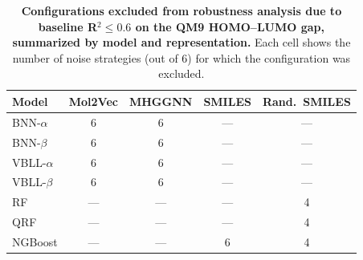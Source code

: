 
\begin{table}[H]
\centering
\caption{\textbf{Configurations excluded from robustness analysis due to baseline R$^2 \leq 0.6$ on the QM9 HOMO--LUMO gap, summarized by model and representation.}
Each cell shows the number of noise strategies (out of 6) for which the configuration was excluded.}
\label{app:noise:excluded_configurations}
\small
\begin{tabular}{lcccc}
\toprule
\textbf{Model} & \textbf{Mol2Vec} & \textbf{MHGGNN} & \textbf{SMILES} & \textbf{Rand.~SMILES} \\
\midrule
BNN-$\alpha$ & 6 & 6 & --- & --- \\
BNN-$\beta$ & 6 & 6 & --- & --- \\
VBLL-$\alpha$ & 6 & 6 & --- & --- \\
VBLL-$\beta$ & 6 & 6 & --- & --- \\
RF & --- & --- & --- & 4 \\
QRF & --- & --- & --- & 4 \\
NGBoost & --- & --- & 6 & 4 \\
\bottomrule
\end{tabular}
\end{table}
